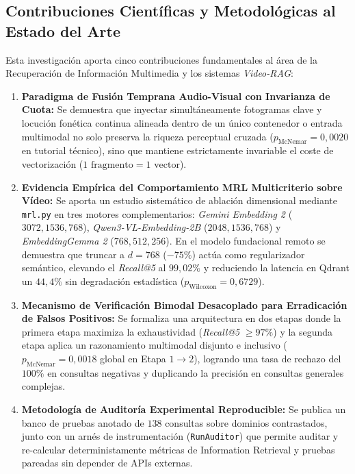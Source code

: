 \subsection{Contribuciones Científicas y Metodológicas al Estado del Arte}
\label{subsec:contribuciones_cientificas}

Esta investigación aporta cinco contribuciones fundamentales al área de la Recuperación de Información Multimedia y los sistemas \textit{Video-RAG}:

\begin{enumerate}
    \item \textbf{Paradigma de Fusión Temprana Audio-Visual con Invarianza de Cuota:} Se demuestra que inyectar simultáneamente fotogramas clave y locución fonética continua alineada dentro de un único contenedor o entrada multimodal no solo preserva la riqueza perceptual cruzada ($p_{\text{McNemar}} = 0,0020$ en tutorial técnico), sino que mantiene estrictamente invariable el coste de vectorización ($1\text{ fragmento} = 1\text{ vector}$).
    \item \textbf{Evidencia Empírica del Comportamiento MRL Multicriterio sobre Vídeo:} Se aporta un estudio sistemático de ablación dimensional mediante \texttt{mrl.py} en tres motores complementarios: \textit{Gemini Embedding 2} ($3072, 1536, 768$), \textit{Qwen3-VL-Embedding-2B} ($2048, 1536, 768$) y \textit{EmbeddingGemma 2} ($768, 512, 256$). En el modelo fundacional remoto se demuestra que truncar a $d = 768$ ($-75\%$) actúa como regularizador semántico, elevando el \textit{Recall@5} al $99,02\%$ y reduciendo la latencia en Qdrant un $44,4\%$ sin degradación estadística ($p_{\text{Wilcoxon}} = 0,6729$).
    \item \textbf{Mecanismo de Verificación Bimodal Desacoplado para Erradicación de Falsos Positivos:} Se formaliza una arquitectura en dos etapas donde la primera etapa maximiza la exhaustividad (\textit{Recall@5} $\ge 97\%$) y la segunda etapa aplica un razonamiento multimodal disjunto e inclusivo ($p_{\text{McNemar}} = 0,0018$ global en Etapa $1 \to 2$), logrando una tasa de rechazo del $100\%$ en consultas negativas y duplicando la precisión en consultas generales complejas.
    \item \textbf{Metodología de Auditoría Experimental Reproducible:} Se publica un banco de pruebas anotado de $138$ consultas sobre dominios contrastados, junto con un arnés de instrumentación (\texttt{RunAuditor}) que permite auditar y re-calcular deterministamente métricas de Information Retrieval y pruebas pareadas sin depender de APIs externas.

\end{enumerate}
